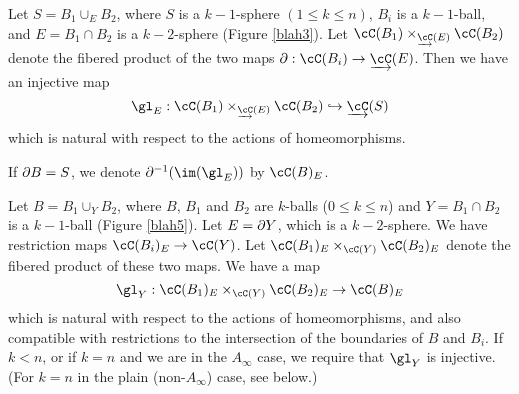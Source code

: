 \documentclass{pnastwo}
\begin{document}
\begin{article}
\begin{lem}
\label{lem:domain-and-range}
Let $S = B_1 \cup_E B_2$, where $S$ is a $k{-}1$-sphere $(1\le k\le n)$,
$B_i$ is a $k{-}1$-ball, and $E = B_1\cap B_2$ is a $k{-}2$-sphere (Figure \ref{blah3}).
Let $\cC(B_1) \times_{\cl{\cC}(E)} \cC(B_2)$ denote the fibered product of the 
two maps $\bd: \cC(B_i)\to \cl{\cC}(E)$.
Then we have an injective map
\[
	\gl_E : \cC(B_1) \times_{\cl{\cC}(E)} \cC(B_2) \into \cl{\cC}(S)
\]
which is natural with respect to the actions of homeomorphisms.
\end{lem}

If $\partial B = S$, we denote $\bdy^{-1}(\im(\gl_E))$ by $\cC(B)_E$.

\begin{axiom}[Gluing]
\label{axiom:composition}
Let $B = B_1 \cup_Y B_2$, where $B$, $B_1$ and $B_2$ are $k$-balls ($0\le k\le n$)
and $Y = B_1\cap B_2$ is a $k{-}1$-ball (Figure \ref{blah5}).
Let $E = \partial Y$, which is a $k{-}2$-sphere.
We have restriction maps $\cC(B_i)_E \to \cC(Y)$.
Let $\cC(B_1)_E \times_{\cC(Y)} \cC(B_2)_E$ denote the fibered product of these two maps. 
We have a map
\[
	\gl_Y : \cC(B_1)_E \times_{\cC(Y)} \cC(B_2)_E \to \cC(B)_E
\]
which is natural with respect to the actions of homeomorphisms, and also compatible with restrictions
to the intersection of the boundaries of $B$ and $B_i$.
If $k < n$,
or if $k=n$ and we are in the $A_\infty$ case, 
we require that $\gl_Y$ is injective.
(For $k=n$ in the plain (non-$A_\infty$) case, see below.)
\end{axiom}


\end{article}
\end{document}
